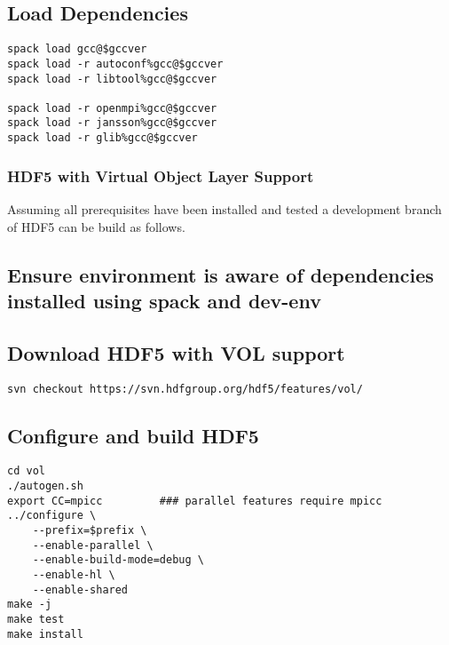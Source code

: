 \subsection{Load Dependencies}%
\label{load-dependencies}

\begin{lstlisting}
spack load gcc@$gccver
spack load -r autoconf%gcc@$gccver
spack load -r libtool%gcc@$gccver

spack load -r openmpi%gcc@$gccver
spack load -r jansson%gcc@$gccver
spack load -r glib%gcc@$gccver
\end{lstlisting}

\subsubsection{HDF5 with Virtual Object Layer Support}%
\label{hdf5-with-virtual-object-layer-support}

Assuming all prerequisites have been installed and tested a development
branch of HDF5 can be build as follows.

\subsection{Ensure environment is aware of dependencies installed using spack and dev-env}%
\label{ensure-environment-is-aware-of-dependencies-installed-using-spack-and-dev-env}

\subsection{Download HDF5 with VOL support}%
\label{download-hdf5-with-vol-support}

\begin{lstlisting}
svn checkout https://svn.hdfgroup.org/hdf5/features/vol/
\end{lstlisting}

\subsection{Configure and build HDF5}%
\label{configure-and-build-hdf5}

\begin{lstlisting}
cd vol
./autogen.sh
export CC=mpicc         ### parallel features require mpicc
../configure \
    --prefix=$prefix \
    --enable-parallel \
    --enable-build-mode=debug \
    --enable-hl \
    --enable-shared
make -j
make test
make install
\end{lstlisting}

